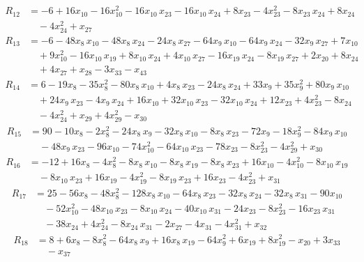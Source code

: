 \begin{align*}
R_{12} &= -6 +16x_{10} -16x_{10}^{2} -16x_{10}\,x_{23} -16x_{10}\,x_{24} +8x_{23} -4x_{23}^{2} -8x_{23}\,x_{24} +8x_{24} \\
&\quad {} -4x_{24}^{2} +x_{27}
\end{align*}
\begin{align*}
R_{13} &= -6 -48x_{8}\,x_{10} -48x_{8}\,x_{24} -24x_{8}\,x_{27} -64x_{9}\,x_{10} -64x_{9}\,x_{24} -32x_{9}\,x_{27} +7x_{10} \\
&\quad {} +9x_{10}^{2} -16x_{10}\,x_{19} +8x_{10}\,x_{24} +4x_{10}\,x_{27} -16x_{19}\,x_{24} -8x_{19}\,x_{27} +2x_{20} +8x_{24} \\
&\quad {} +4x_{27} +x_{28} -3x_{33} -x_{43}
\end{align*}
\begin{align*}
R_{14} &= 6 -19x_{8} -35x_{8}^{2} -80x_{8}\,x_{10} +4x_{8}\,x_{23} -24x_{8}\,x_{24} +33x_{9} +35x_{9}^{2} +80x_{9}\,x_{10} \\
&\quad {} +24x_{9}\,x_{23} -4x_{9}\,x_{24} +16x_{10} +32x_{10}\,x_{23} -32x_{10}\,x_{24} +12x_{23} +4x_{23}^{2} -8x_{24} \\
&\quad {} -4x_{24}^{2} +x_{29} +4x_{29}^{2} -x_{30}
\end{align*}
\begin{align*}
R_{15} &= 90 -10x_{8} -2x_{8}^{2} -24x_{8}\,x_{9} -32x_{8}\,x_{10} -8x_{8}\,x_{23} -72x_{9} -18x_{9}^{2} -84x_{9}\,x_{10} \\
&\quad {} -48x_{9}\,x_{23} -96x_{10} -74x_{10}^{2} -64x_{10}\,x_{23} -78x_{23} -8x_{23}^{2} -4x_{29}^{2} +x_{30}
\end{align*}
\begin{align*}
R_{16} &= -12 +16x_{8} -4x_{8}^{2} -8x_{8}\,x_{10} -8x_{8}\,x_{19} -8x_{8}\,x_{23} +16x_{10} -4x_{10}^{2} -8x_{10}\,x_{19} \\
&\quad {} -8x_{10}\,x_{23} +16x_{19} -4x_{19}^{2} -8x_{19}\,x_{23} +16x_{23} -4x_{23}^{2} +x_{31}
\end{align*}
\begin{align*}
R_{17} &= 25 -56x_{8} -48x_{8}^{2} -128x_{8}\,x_{10} -64x_{8}\,x_{23} -32x_{8}\,x_{24} -32x_{8}\,x_{31} -90x_{10} \\
&\quad {} -52x_{10}^{2} -48x_{10}\,x_{23} -8x_{10}\,x_{24} -40x_{10}\,x_{31} -24x_{23} -8x_{23}^{2} -16x_{23}\,x_{31} \\
&\quad {} -38x_{24} +4x_{24}^{2} -8x_{24}\,x_{31} -2x_{27} -4x_{31} -4x_{31}^{2} +x_{32}
\end{align*}
\begin{align*}
R_{18} &= 8 +6x_{8} -8x_{8}^{2} -64x_{8}\,x_{9} +16x_{8}\,x_{19} -64x_{9}^{2} +6x_{19} +8x_{19}^{2} -x_{20} +3x_{33} \\
&\quad {} -x_{37}
\end{align*}
